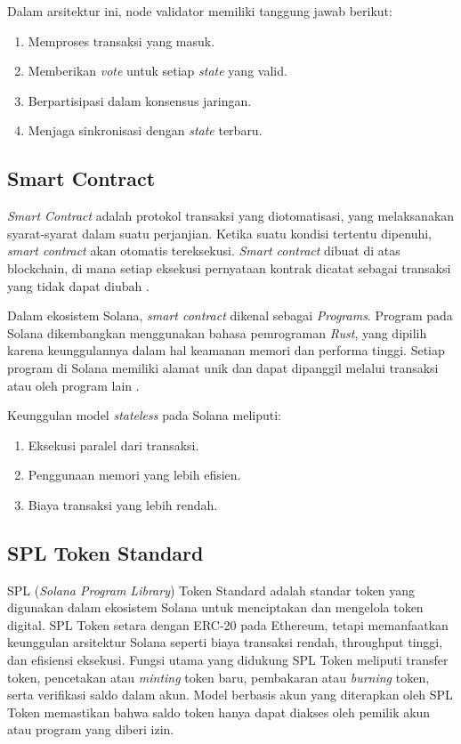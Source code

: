 Dalam arsitektur ini, node validator memiliki tanggung jawab berikut:
\begin{enumerate}
    \item Memproses transaksi yang masuk.
    \item Memberikan \textit{vote} untuk setiap \textit{state} yang valid.
    \item Berpartisipasi dalam konsensus jaringan.
    \item Menjaga sinkronisasi dengan \textit{state} terbaru.
\end{enumerate}

\subsection{Smart Contract}
\textit{Smart Contract} adalah protokol transaksi yang diotomatisasi, yang melaksanakan syarat-syarat dalam suatu perjanjian. Ketika suatu kondisi tertentu dipenuhi, \textit{smart contract} akan otomatis tereksekusi. \textit{Smart contract} dibuat di atas blockchain, di mana setiap eksekusi pernyataan kontrak dicatat sebagai transaksi yang tidak dapat diubah \parencite{ref1}.

Dalam ekosistem Solana, \textit{smart contract} dikenal sebagai \textit{Programs}. Program pada Solana dikembangkan menggunakan bahasa pemrograman \textit{Rust}, yang dipilih karena keunggulannya dalam hal keamanan memori dan performa tinggi. Setiap program di Solana memiliki alamat unik dan dapat dipanggil melalui transaksi atau oleh program lain \parencite{ref9}.

Keunggulan model \textit{stateless} pada Solana meliputi:
\begin{enumerate}
    \item Eksekusi paralel dari transaksi.
    \item Penggunaan memori yang lebih efisien.
    \item Biaya transaksi yang lebih rendah.
\end{enumerate}

\subsection{SPL Token Standard}

SPL (\textit{Solana Program Library}) Token Standard adalah standar token yang digunakan dalam ekosistem Solana untuk menciptakan dan mengelola token digital. SPL Token setara dengan ERC-20 pada Ethereum, tetapi memanfaatkan keunggulan arsitektur Solana seperti biaya transaksi rendah, throughput tinggi, dan efisiensi eksekusi. Fungsi utama yang didukung SPL Token meliputi transfer token, pencetakan atau \textit{minting} token baru, pembakaran atau \textit{burning} token, serta verifikasi saldo dalam akun. Model berbasis akun yang diterapkan oleh SPL Token memastikan bahwa saldo token hanya dapat diakses oleh pemilik akun atau program yang diberi izin.

